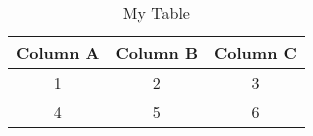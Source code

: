 \begin{table}[h]
	\centering{}
	\caption{My Table}\label{tab:mytable}
	\begin{tabular}{ccc}\toprule
		\textbf{Column A} & \textbf{Column B} & \textbf{Column C} \\ \midrule
		1                 & 2                 & 3                 \\
		4                 & 5                 & 6                 \\
		\bottomrule
	\end{tabular}
\end{table}

